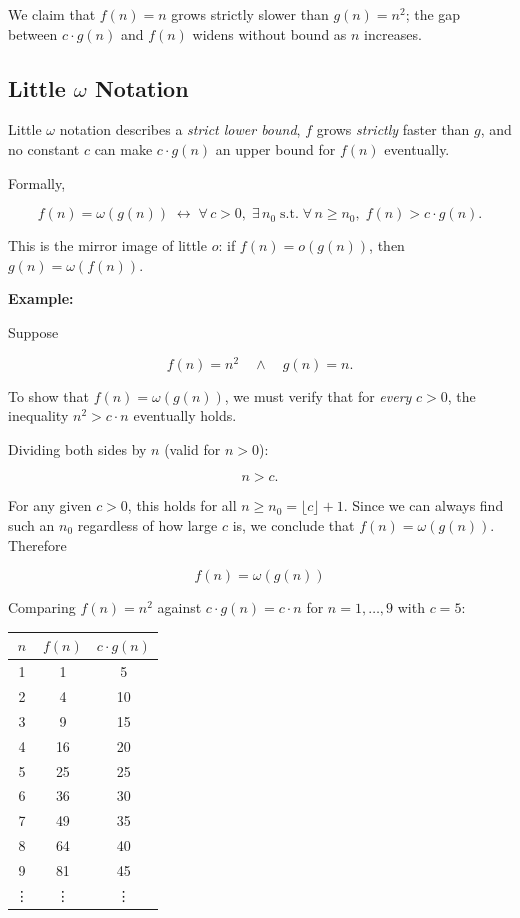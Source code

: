 \documentclass[12pt,a4paper,openany]{article}
\begin{document}
We claim that $f(n) = n$ grows strictly slower than $g(n) = n^2$; the gap between $c \cdot g(n)$ and $f(n)$ widens without bound as $n$ increases.

\subsection{Little $\omega$ Notation}

Little $\omega$ notation describes a \emph{strict lower bound}, $f$ grows \emph{strictly} faster than $g$, and no constant $c$ can make $c \cdot g(n)$ an upper bound for $f(n)$ eventually.

Formally,

\[
f(n) = \omega(g(n))
\;\leftrightarrow\;
\forall\, c > 0,\; \exists\, n_0
\;\text{s.t.}\;
\forall\, n \ge n_0,\;
f(n) > c \cdot g(n).
\]

This is the mirror image of little $o$: if $f(n) = o(g(n))$, then $g(n) = \omega(f(n))$.

\textbf{Example:}

Suppose

\[
f(n) = n^2 \quad \land \quad g(n) = n.
\]

To show that \( f(n) = \omega(g(n)) \), we must verify that for \emph{every} $c > 0$, the inequality $n^2 > c \cdot n$ eventually holds.

Dividing both sides by $n$ (valid for $n > 0$):

\[
n > c.
\]

For any given $c > 0$, this holds for all $n \ge n_0 = \lfloor c \rfloor + 1$. Since we can always find such an $n_0$ regardless of how large $c$ is, we conclude that $f(n) = \omega(g(n))$. Therefore

\[\boxed{f(n) = \omega(g(n))}\]

Comparing $f(n) = n^2$ against $c \cdot g(n) = c \cdot n$ for $n = 1,\ldots,9$ with $c = 5$:

\begin{table}[h]
\centering
\begin{tabular}{|c|c|c|}
\hline
\textbf{$n$} & \textbf{$f(n)$} & \textbf{$c \cdot g(n)$} \\
\hline
1 & 1  & 5  \\
2 & 4  & 10 \\
3 & 9  & 15 \\
4 & 16 & 20 \\
5 & 25 & 25 \\
6 & 36 & 30 \\
7 & 49 & 35 \\
8 & 64 & 40 \\
9 & 81 & 45 \\
\vdots & \vdots & \vdots \\
\hline
\end{tabular}
\end{table}
\end{document}
